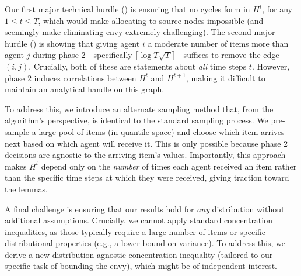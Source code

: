 Our first major technical hurdle () is ensuring that no cycles form in $H^t$, for any $1 \leq t \leq T$, which would make allocating to source nodes impossible (and seemingly make eliminating envy extremely challenging). The second major hurdle () is showing that giving agent $i$ a moderate number of items more than agent $j$ during phase 2---specifically $\lceil \log T \sqrt{T} \rceil$---suffices to remove the edge $(i, j)$. Crucially, both of these are statements about \emph{all} time steps $t$. However, phase 2 induces correlations between $H^t$ and $H^{t+1}$, making it difficult to maintain an analytical handle on this graph.

To address this, we introduce an alternate sampling method that, from the algorithm's perspective, is identical to the standard sampling process. We pre-sample a large pool of items (in quantile space) and choose which item arrives next based on which agent will receive it. This is only possible because phase 2 decisions are agnostic to the arriving item's values. Importantly, this approach makes $H^t$ depend only on the \emph{number} of times each agent received an item rather than the specific time steps at which they were received, giving traction toward the lemmas. 

A final challenge is ensuring that our results hold for \emph{any} distribution without additional assumptions. Crucially, we cannot apply standard concentration inequalities, as those typically require a large number of items or specific distributional properties (e.g., a lower bound on variance). To address this, we derive a new distribution-agnostic concentration inequality (tailored to our specific task of bounding the envy), which might be of independent interest.





